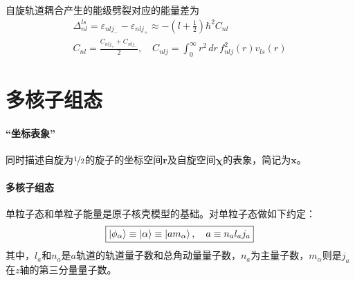 自旋轨道耦合产生的能级劈裂对应的能量差为
\begin{align}
	\Delta_{nl}^{ls} = \varepsilon_{nlj_{-}} - \varepsilon_{nlj_{+}} \approx -(l + \frac{1}{2})\hbar^2 C_{nl} \\
	C_{nl} = \frac{C_{nlj_{+}} + C_{nlj_{-}}}{2},
	\quad
	C_{nlj} = \int_{0}^{\infty} r^2\, dr\, f_{nlj}^2(r) v_{ls}(r)
\end{align}

\section{多核子组态}
\paragraph*{“坐标表象”}
同时描述自旋为$\nicefrac{1}{2}$的旋子的坐标空间$\bm{r}$及自旋空间$\bm{\chi}$的表象，简记为$\bm{x}$。

\paragraph*{多核子组态}
单粒子态和单粒子能量是原子核壳模型的基础。对单粒子态做如下约定：
\begin{equation}\boxed{
	\ket{\phi_{\alpha}} \equiv \ket{\alpha} \equiv \ket{am_{\alpha}}, \quad a \equiv n_{a} l_{a} j_{a} \label{eq:sgl-part-stat}
}\end{equation}
其中，$l_a$和$n_a$是$a$轨道的轨道量子数和总角动量量子数，$n_a$为主量子数，$m_{\alpha}$则是$j_a$在$z$轴的第三分量量子数。




